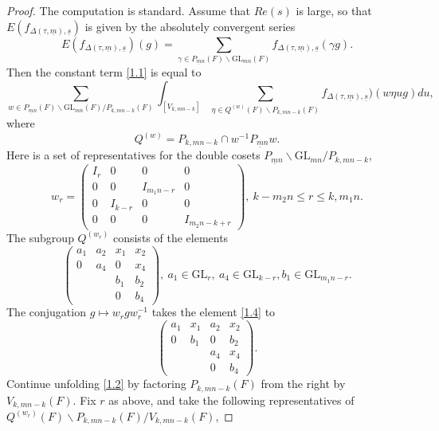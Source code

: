 \documentclass[12pts]{amsart}
\newcommand{\GL}{{\mathrm{GL}}}
\begin{document}
\begin{proof}

	The computation is standard. Assume that $Re(s)$ is large, so that $E(f_{\Delta(\tau,\underline{m}),\underline{s}})$ is given by the absolutely convergent series
$$
E(f_{\Delta(\tau,\underline{m}),\underline{s}})(g)=\sum_{\gamma\in P_{\underline{m}n}(F)\backslash \GL_{mn}(F)}f_{\Delta(\tau,\underline{m}),\underline{s}}(\gamma g).
$$
Then the constant term \eqref{1.1} is equal to
\begin{equation}\label{1.2}
\sum_{w\in P_{\underline{m}n}(F)\backslash \GL_{mn}(F)/P_{k,mn-k}(F)}	\int_{[V_{k,mn-k}]}\sum_{\eta\in Q^{(w)}(F)\backslash P_{k,mn-k}(F)}f_{\Delta(\tau,\underline{m}),\underline{s}})(w\eta ug)du,
\end{equation}
where
$$
Q^{(w)}=P_{k,mn-k}\cap w^{-1}P_{\underline{m}n}w.
$$
Here is a set of representatives for the double cosets $P_{\underline{m}n}\backslash \GL_{mn}/P_{k,mn-k}$,
\begin{equation}\label{1.3}
	w_r=\begin{pmatrix}I_r&0&0&0\\0&0&I_{m_1n-r}&0\\0&I_{k-r}&0&0\\0&0&0&I_{m_2n-k+r}\end{pmatrix},\ k-m_2n\leq r\leq k, m_1n.
\end{equation}    	
The subgroup $Q^{(w_r)}$ consists of the elements
\begin{equation}\label{1.4}
	\begin{pmatrix} a_1&a_2&x_1&x_2\\0&a_4&0&x_4\\&&b_1&b_2\\&&0&b_4\end{pmatrix},\ a_1\in \GL_r,\ a_4\in \GL_{k-r}, b_1\in \GL_{m_1n-r}.
\end{equation}	
The conjugation $g\mapsto w_rgw_r^{-1}$ takes the element \eqref{1.4} to
\begin{equation}\label{1.5}
	\begin{pmatrix}a_1&x_1&a_2&x_2\\0&b_1&0&b_2\\&&a_4&x_4\\&&0&b_4\end{pmatrix}.
\end{equation}
Continue unfolding \eqref{1.2} by factoring $P_{k,mn-k}(F)$ from the right by $V_{k,mn-k}(F)$. Fix $r$ as above, and take the following representatives of  $Q^{(w_r)}(F)\backslash P_{k,mn-k}(F)/V_{k,mn-k}(F)$,

\end{proof}
\end{document}

